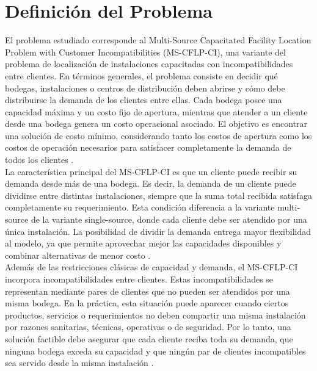 \section{Definición del Problema}

\noindent El problema estudiado corresponde al Multi-Source Capacitated Facility Location Problem with Customer Incompatibilities (MS-CFLP-CI), una variante del problema de localización de instalaciones capacitadas con incompatibilidades entre clientes. En términos generales, el problema consiste en decidir qué bodegas, instalaciones o centros de distribución deben abrirse y cómo debe distribuirse la demanda de los clientes entre ellas. Cada bodega posee una capacidad máxima y un costo fijo de apertura, mientras que atender a un cliente desde una bodega genera un costo operacional asociado. El objetivo es encontrar una solución de costo mínimo, considerando tanto los costos de apertura como los costos de operación necesarios para satisfacer completamente la demanda de todos los clientes \cite{klose2005facility,maia2023metaheuristic,ceschia2024multineighborhood}.\\

\noindent La característica principal del MS-CFLP-CI es que un cliente puede recibir su demanda desde más de una bodega. Es decir, la demanda de un cliente puede dividirse entre distintas instalaciones, siempre que la suma total recibida satisfaga completamente su requerimiento. Esta condición diferencia a la variante multi-source de la variante single-source, donde cada cliente debe ser atendido por una única instalación. La posibilidad de dividir la demanda entrega mayor flexibilidad al modelo, ya que permite aprovechar mejor las capacidades disponibles y combinar alternativas de menor costo \cite{mansini2022kernel,ceschia2024multineighborhood}.\\

\noindent Además de las restricciones clásicas de capacidad y demanda, el MS-CFLP-CI incorpora incompatibilidades entre clientes. Estas incompatibilidades se representan mediante pares de clientes que no pueden ser atendidos por una misma bodega. En la práctica, esta situación puede aparecer cuando ciertos productos, servicios o requerimientos no deben compartir una misma instalación por razones sanitarias, técnicas, operativas o de seguridad. Por lo tanto, una solución factible debe asegurar que cada cliente reciba toda su demanda, que ninguna bodega exceda su capacidad y que ningún par de clientes incompatibles sea servido desde la misma instalación \cite{maia2023metaheuristic,mansini2022kernel,ceschia2024multineighborhood}.\\

